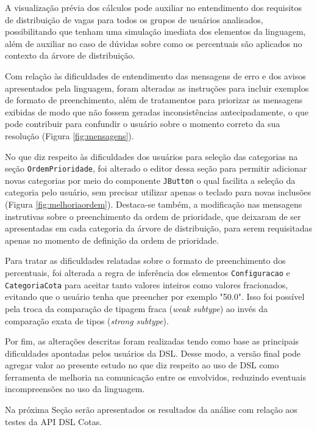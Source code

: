 \clearpage



A visualização prévia dos cálculos pode auxiliar no entendimento dos requisitos de distribuição de vagas para todos os grupos de usuários analisados, possibilitando que tenham uma simulação imediata dos elementos da linguagem, além de auxiliar no caso de dúvidas sobre como os percentuais são aplicados no contexto da árvore de distribuição.

Com relação às dificuldades de entendimento das mensagens de erro e dos avisos apresentados pela linguagem, foram alteradas as instruções para incluir exemplos de formato de preenchimento, além de tratamentos para priorizar as mensagens exibidas de modo que não fossem geradas inconsistências antecipadamente, o que pode contribuir para confundir o usuário sobre o momento correto da sua resolução (Figura \ref{fig:mensagens}).



No que diz respeito às dificuldades dos usuários para seleção das categorias na seção \texttt{OrdemPrioridade}, foi alterado o editor dessa seção para permitir adicionar novas categorias por meio do componente \texttt{JButton} o qual facilita a seleção da categoria pelo usuário, sem precisar utilizar apenas o teclado para novas inclusões (Figura \ref{fig:melhoriaordem}). Destaca-se também, a modificação nas mensagens instrutivas sobre o preenchimento da ordem de prioridade, que deixaram de ser apresentadas em cada categoria da árvore de distribuição, para serem requisitadas apenas no momento de definição da ordem de prioridade.



Para tratar as dificuldades relatadas sobre o formato de preenchimento dos percentuais, foi alterada a regra de inferência dos elementos \texttt{Configuracao} e \texttt{CategoriaCota} para aceitar tanto valores inteiros como valores fracionados, evitando que o usuário tenha que preencher por exemplo "50.0". Isso foi possível pela troca da comparação de tipagem fraca (\textit{weak subtype}) ao invés da comparação exata de tipos (\textit{strong subtype}).



\newpage
Por fim, as alterações descritas foram realizadas tendo como base as principais dificuldades apontadas pelos usuários da DSL. Desse modo, a versão final pode agregar valor ao presente estudo no que diz respeito ao uso de DSL como ferramenta de melhoria na comunicação entre os envolvidos, reduzindo eventuais incompreensões no uso da linguagem.

Na próxima Seção serão apresentados os resultados da análise com relação aos testes da \gls{API} DSL Cotas.